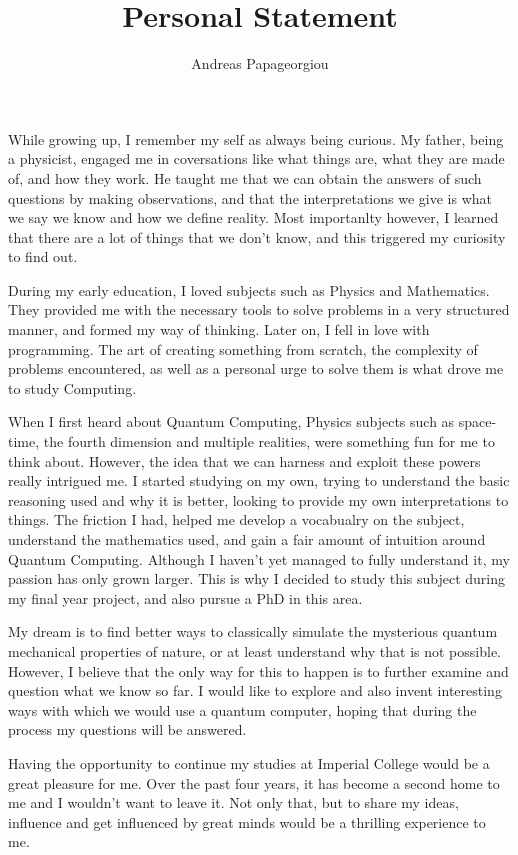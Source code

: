 \documentclass[a4paper,10pt]{article}
\title{Personal Statement}
\author{Andreas Papageorgiou}
\date{}
\begin{document}
\maketitle
\thispagestyle{empty}

\onehalfspacing

While growing up, I remember my self as always being curious. My father, being a physicist, engaged me in coversations like
what things are, what they are made of, and how they work. He taught me that we can obtain the answers of such
questions by making observations, and that the interpretations we give is what we say we know and how we define reality.
Most importanlty however, I learned that there are a lot of things that we don't know, and this triggered my curiosity to find out.

During my early education, I loved subjects such as Physics and Mathematics. They provided me with the necessary tools
to solve problems in a very structured manner, and formed my way of thinking. Later on, I fell in love with programming.
The art of creating something from scratch, the complexity of problems encountered, as well as a personal urge to solve them
is what drove me to study Computing.

When I first heard about Quantum Computing, Physics subjects such as space-time, the fourth dimension and multiple realities, were 
something fun for me to think about. However, the idea that we can harness and exploit these powers really intrigued me.
I started studying on my own, trying to understand the basic reasoning used and why it is better, looking to provide my own
interpretations to things. The friction I had, helped me develop a vocabualry on the subject, understand the mathematics used,
and gain a fair amount of intuition around Quantum Computing. Although I haven't yet managed to fully understand it,
my passion has only grown larger. This is why I decided to study this subject during my final year project, and also pursue a PhD in this area.

My dream is to find better ways to classically simulate the mysterious quantum mechanical properties of nature, or at least understand
why that is not possible. However, I believe that the only way for this to happen is to further examine and question what we know so far.
I would like to explore and also invent interesting ways with which we would use a quantum computer,
hoping that during the process my questions will be answered.

Having the opportunity to continue my studies  at Imperial College would be a great pleasure for me. Over the past four years, it has become
a second home to me and I wouldn't want to leave it. Not only that, but to share my ideas, influence and get influenced by great minds would be a thrilling
experience to me.
\end{document}
